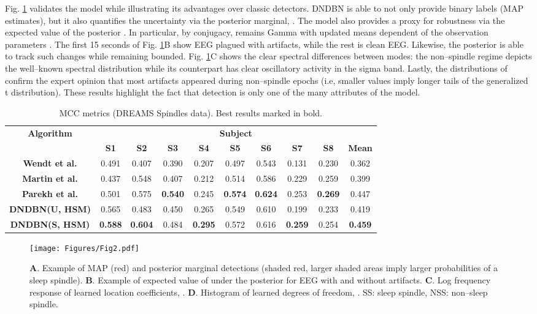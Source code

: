 \documentclass[runningheads]{llncs}
\begin{document}
Fig. \ref{fig:Fig2} validates the model while illustrating its advantages over classic detectors. DNDBN is able to not only provide binary labels (MAP estimates), but it also quantifies the uncertainty via the posterior marginal, . The model also provides a proxy for robustness via the expected value of the posterior . In particular, by conjugacy,  remains Gamma with updated means dependent of the observation parameters \cite{peel2000robust}. The first 15 seconds of Fig.  \ref{fig:Fig2}B show EEG plagued with artifacts, while the rest is clean EEG. Likewise, the posterior  is able to track such changes while remaining bounded. Fig. \ref{fig:Fig2}C  shows the clear spectral differences between modes: the non--spindle regime depicts the well--known  spectral distribution \cite{freeman2012imaging} while its counterpart has clear oscillatory activity in the sigma band. Lastly, the distributions of   confirm the expert opinion that most artifacts appeared during non--spindle epochs (i.e, smaller values imply longer tails of the generalized t distribution). These  results highlight the fact that detection is only one of the many attributes of the model.
\begin{table*}[tb]
	\centering
	\caption{MCC metrics (DREAMS Spindles data). Best results marked in bold.}
	\label{table:Supervised}
	\begin{tabular}{|c||c|c|c|c|c|c|c|c||c|}
		\hline
		\textbf{Algorithm} & \multicolumn{9}{c|}{\textbf{Subject}} \\
		\cline{2-10}
		& \textbf{S1} & \textbf{S2} &  \textbf{S3} & \textbf{S4} & \textbf{S5} & \textbf{S6} & \textbf{S7} & \textbf{S8} & \textbf{Mean}\\
		\hline
		\textbf{Wendt et al.} & 0.491 & 0.407 & 0.390 & 0.207 & 0.497 & 0.543 & 0.131 & 0.230 & 0.362 \\
		\hline
		\textbf{Martin et al.} & 0.437 & 0.548 & 0.407 & 0.212 & 0.514 & 0.586 & 0.229 & 0.259 & 0.399 \\
		\hline
		\textbf{Parekh et al.} & 0.501 & 0.575 & \textbf{0.540} & 0.245 & \textbf{0.574} & \textbf{0.624} & 0.253 & \textbf{0.269} &  0.447\\
		\hline
		\textbf{DNDBN(U, HSM)} & 0.565 & 0.483 & 0.450 & 0.265 & 0.549 & 0.610 & 0.199 & 0.233 & 0.419 \\
		\hline
		\textbf{DNDBN(S, HSM)} & \textbf{0.588} & \textbf{0.604} & 0.484 & \textbf{0.295} & 0.572 & 0.616 & \textbf{0.259} & 0.254 & \textbf{0.459} \\
		\hline
	\end{tabular}
\end{table*}
\begin{figure}[tb]
	\centering
	\texttt{[image: Figures/Fig2.pdf]}
	\caption{\textbf{A}. Example of MAP (red) and posterior marginal detections (shaded red, larger shaded areas imply larger probabilities of a sleep spindle). \textbf{B}. Example of expected value of  under the posterior for EEG with and without artifacts. \textbf{C}. Log frequency response of learned location coefficients, \theta. \textbf{D}. Histogram of learned degrees of freedom, . SS: sleep spindle, NSS: non--sleep spindle.}
	\label{fig:Fig2}
\end{figure}
\end{document}
